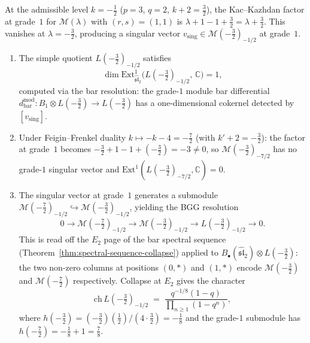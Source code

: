 \begin{example}
\label{ex:ext1-admissible-fractional}
At the admissible level $k = -\tfrac{1}{2}$
($p = 3$, $q = 2$, $k + 2 = \tfrac{3}{2}$),
the Kac--Kazhdan factor at grade~$1$
for $\mathcal{M}(\lambda)$ with $(r,s) = (1,1)$ is
$\lambda + 1 - 1 + \tfrac{3}{2} = \lambda + \tfrac{3}{2}$.
This vanishes at $\lambda = -\tfrac{3}{2}$, producing a singular
vector $v_{\mathrm{sing}} \in \mathcal{M}(-\tfrac{3}{2})_{-1/2}$
at grade~$1$.
\begin{enumerate}[label=\textup{(\roman*)}]
\item The simple quotient $L(-\tfrac{3}{2})_{-1/2}$ satisfies
 \begin{equation}\label{eq:ext1-fractional}
 \dim \mathrm{Ext}^1_{\widehat{\mathfrak{sl}}_2}
 \bigl(L(-\tfrac{3}{2})_{-1/2},\, \mathbb{C}\bigr) = 1,
 \end{equation}
 computed via the bar resolution: the grade-$1$ module bar
 differential
 $d^{\mathrm{mod}}_{\mathrm{bar}}\colon
 B_1 \otimes L(-\tfrac{3}{2}) \to L(-\tfrac{3}{2})$
 has a one-dimensional cokernel detected by
 $[v_{\mathrm{sing}}]$.

\item Under Feigin--Frenkel duality
 $k \mapsto -k - 4 = -\tfrac{7}{2}$
 (with $k' + 2 = -\tfrac{3}{2}$):
 the factor at grade~$1$ becomes
 $-\tfrac{3}{2} + 1 - 1 + (-\tfrac{3}{2}) = -3 \neq 0$,
 so $\mathcal{M}(-\tfrac{3}{2})_{-7/2}$ has no grade-$1$
 singular vector and
 $\mathrm{Ext}^1(L(-\tfrac{3}{2})_{-7/2}, \mathbb{C}) = 0$.

\item The singular vector at grade~$1$ generates a submodule
 $\mathcal{M}(-\tfrac{7}{2})_{-1/2} \hookrightarrow
 \mathcal{M}(-\tfrac{3}{2})_{-1/2}$, yielding the BGG resolution
 \begin{equation}\label{eq:bgg-admissible}
 0 \to \mathcal{M}(-\tfrac{7}{2})_{-1/2} \to
 \mathcal{M}(-\tfrac{3}{2})_{-1/2} \to
 L(-\tfrac{3}{2})_{-1/2} \to 0.
 \end{equation}
 This is read off the $E_2$ page of the bar spectral sequence
 (Theorem~\ref{thm:spectral-sequence-collapse}) applied to
 $B_\bullet(\widehat{\mathfrak{sl}}_2) \otimes L(-\tfrac{3}{2})$:
 the two non-zero columns at positions $(0, *)$ and $(1, *)$
 encode $\mathcal{M}(-\tfrac{3}{2})$ and
 $\mathcal{M}(-\tfrac{7}{2})$ respectively. Collapse at $E_2$
 gives the character
 \begin{equation}\label{eq:admissible-character}
 \mathrm{ch}\, L(-\tfrac{3}{2})_{-1/2}
 \;=\;
 \frac{q^{-1/8}(1 - q)}{\prod_{n \geq 1}(1 - q^n)},
 \end{equation}
 where $h(-\tfrac{3}{2}) =
 (-\tfrac{3}{2})(\tfrac{1}{2})/(4 \cdot \tfrac{3}{2}) = -\tfrac{1}{8}$
 and the grade-$1$ submodule has $h(-\tfrac{7}{2}) = -\tfrac{1}{8}+1
 = \tfrac{7}{8}$.
\end{enumerate}
\end{example}

